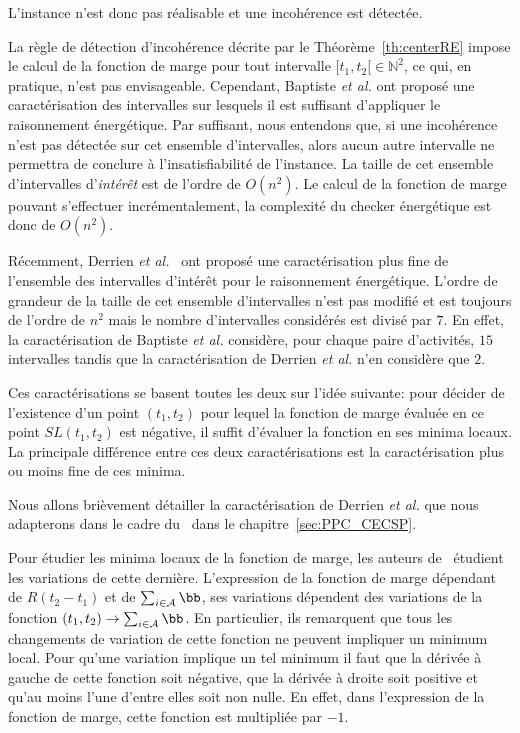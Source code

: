 \begin{ex}
L'instance n'est donc pas réalisable et une incohérence est détectée. 
\end{ex}

La règle de détection d'incohérence décrite par le
Théorème~\ref{th:centerRE} impose le calcul de la fonction de marge
pour tout intervalle $[t_1,t_2[ \in \mathbb{N}^2$, ce qui, en
pratique, n'est pas envisageable. Cependant, Baptiste {\it et al.} ont
proposé une caractérisation des intervalles sur lesquels il est
suffisant d'appliquer le raisonnement énergétique. Par suffisant, nous
entendons que, si une incohérence n'est pas détectée sur cet ensemble
d'intervalles, alors aucun autre intervalle ne permettra de conclure à
l'insatisfiabilité de l'instance. La taille de cet ensemble
d'intervalles d'{\it intérêt} est de l'ordre de $O(n^2)$. Le calcul de
la fonction de marge pouvant s'effectuer incrémentalement, la
complexité du checker énergétique est donc de $O(n^2)$.

Récemment, Derrien {\it et al.}~\cite{DP} ont proposé une
caractérisation plus fine de l'ensemble des intervalles d'intérêt pour
le raisonnement énergétique. L'ordre de grandeur de la taille de cet
ensemble d'intervalles n'est pas modifié et est toujours de l'ordre de
$n^2$ mais le nombre d'intervalles considérés est divisé par $7$. En
effet, la caractérisation de Baptiste {\it et al.} considère, pour
chaque paire d'activités, $15$ intervalles tandis que la
caractérisation de Derrien {\it et al.} n'en considère que $2$.


Ces caractérisations se basent toutes les deux sur l'idée suivante:
pour décider de l'existence d'un point $(t_1,t_2)$ pour lequel la
fonction de marge évaluée en ce point $SL(t_1,t_2)$ est négative, il
suffit d'évaluer la fonction en ses minima locaux. La principale
différence entre ces deux caractérisations est la caractérisation plus
ou moins fine de ces minima.

Nous allons brièvement détailler la caractérisation de Derrien {\it et
al.} que nous adapterons dans le cadre du \CECSP~dans le
chapitre~\ref{sec:PPC_CECSP}.

Pour étudier les minima locaux de la fonction de marge, les auteurs
de~\cite{DP} étudient les variations de cette dernière. L'expression
de la fonction de marge dépendant de $R(t_2-t_1)$ et de $\sum_{i \in
  \A} \bb$, ses variations dépendent des variations de la fonction
$(t_1,t_2) \rightarrow \sum_{i \in \A} \bb$. En particulier, ils
remarquent que tous les changements de variation de cette fonction ne
peuvent impliquer un minimum local. Pour qu'une variation implique un
tel minimum il faut que la dérivée à gauche de cette fonction soit
négative, que la dérivée à droite soit positive et qu'au moins l'une
d'entre elles soit non nulle. En effet, dans l'expression de la
fonction de marge, cette fonction est multipliée par $-1$.

